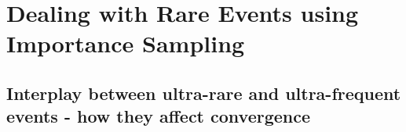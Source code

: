 \chapter{Dealing with Rare Events using Importance Sampling}
\section{Interplay between ultra-rare and ultra-frequent events - how they affect convergence}
